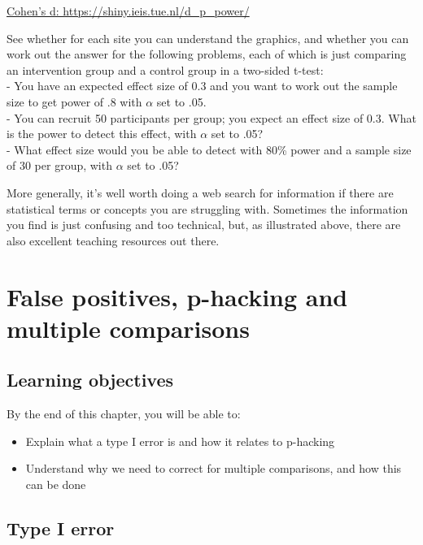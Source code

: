 \documentclass{krantz}
\begin{document}
\href{https://shiny.ieis.tue.nl/d_p_power/}{Cohen's d: https://shiny.ieis.tue.nl/d\_p\_power/}

See whether for each site you can understand the graphics, and whether you can work out the answer for the following problems, each of which is just comparing an intervention group and a control group in a two-sided t-test:\\
- You have an expected effect size of 0.3 and you want to work out the sample size to get power of .8 with \(\alpha\) set to .05.\\
- You can recruit 50 participants per group; you expect an effect size of 0.3. What is the power to detect this effect, with \(\alpha\) set to .05?\\
- What effect size would you be able to detect with 80\% power and a sample size of 30 per group, with \(\alpha\) set to .05?

More generally, it's well worth doing a web search for information if there are statistical terms or concepts you are struggling with. Sometimes the information you find is just confusing and too technical, but, as illustrated above, there are also excellent teaching resources out there.

\hypertarget{phacking}{%
\chapter{False positives, p-hacking and multiple comparisons}\label{phacking}}

\hypertarget{learning-objectives-11}{%
\section{Learning objectives}\label{learning-objectives-11}}

By the end of this chapter, you will be able to:

\begin{itemize}
\item
  Explain what a type I error is and how it relates to p-hacking
\item
  Understand why we need to correct for multiple comparisons, and how this can be done
\end{itemize}

\hypertarget{type-i-error}{%
\section{Type I error}\label{type-i-error}}
\end{document}
